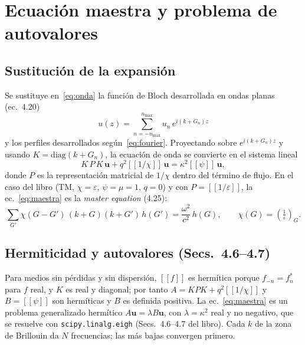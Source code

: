 \documentclass[11pt,a4paper]{article}
\newcommand{\toep}[1]{[\![#1]\!]}
\newcommand{\code}[1]{\texttt{#1}}
\begin{document}
\section{Ecuación maestra y problema de autovalores}\label{sec:maestra}

\subsection{Sustitución de la expansión}

Se sustituye en~\eqref{eq:onda} la función de Bloch desarrollada en ondas
planas (ec.~4.20)
\begin{equation}
u(z)=\sum_{n=-n_{\max}}^{n_{\max}}u_n\,e^{i(k+G_n)z}
\end{equation}
y los perfiles desarrollados según~\eqref{eq:fourier}. Proyectando sobre
$e^{i(k+G_n)z}$ y usando $K=\mathrm{diag}(k+G_n)$, la ecuación de onda se
convierte en el sistema lineal
\begin{equation}
K\,P\,K\,\mathbf u+q^2\toep{1/\chi}\,\mathbf u=\kappa^2\toep{\psi}\,\mathbf u ,
\label{eq:maestra}
\end{equation}
donde $P$ es la representación matricial de $1/\chi$ dentro del término de
flujo. En el caso del libro (TM, $\chi=\varepsilon$, $\psi=\mu=1$, $q=0$) y con
$P=\toep{1/\varepsilon}$, la ec.~\eqref{eq:maestra} es la \emph{master
equation} (4.25):
\begin{equation}
\sum_{G'}\chi(G-G')\,(k+G)(k+G')\,h(G')=\frac{\omega^2}{c^2}\,h(G),
\qquad \chi(G)=\left(\tfrac1\varepsilon\right)_G .
\end{equation}

\subsection{Hermiticidad y autovalores (Secs.~4.6--4.7)}

Para medios sin pérdidas y sin dispersión, $\toep{f}$ es hermítica porque
$f_{-n}=f_n^*$ para $f$ real, y $K$ es real y diagonal; por tanto
$A=KPK+q^2\toep{1/\chi}$ y $B=\toep{\psi}$ son hermíticas y $B$ es definida
positiva. La ec.~\eqref{eq:maestra} es un problema generalizado hermítico
$A\mathbf u=\lambda B\mathbf u$, con $\lambda=\kappa^2$ real y no negativo, que
se resuelve con \code{scipy.linalg.eigh} (Secs.~4.6--4.7 del libro). Cada $k$
de la zona de Brillouin da $N$ frecuencias; las más bajas convergen primero.
\end{document}
